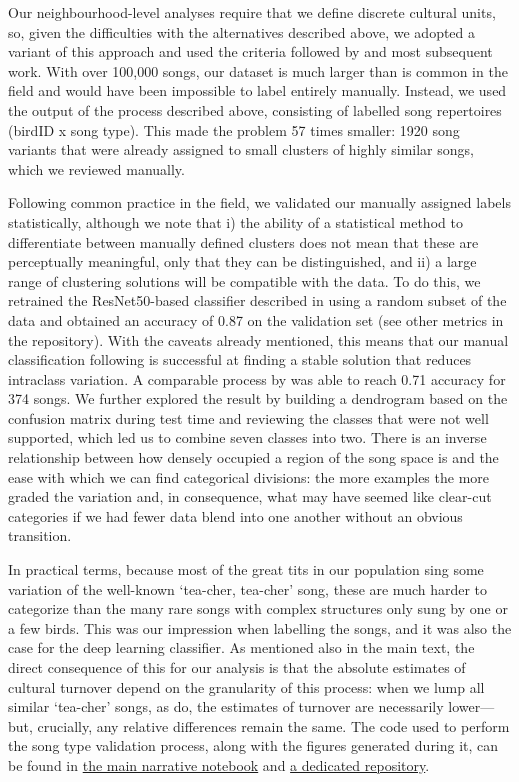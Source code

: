 Our neighbourhood-level analyses require that we define discrete cultural units, so, given the difficulties with the alternatives described above, we adopted a variant of this approach and used the criteria followed by \textcite{mcgregor1982b} and most subsequent work. With over 100,000 songs, our dataset is much larger than is common in the field and would have been impossible to label entirely manually. Instead, we used the output of the process described above, consisting of labelled song repertoires (birdID x song type). This made the problem 57 times smaller: 1920 song variants that were already assigned to small clusters of highly similar songs, which we reviewed manually.

Following common practice in the field, we validated our manually assigned labels statistically, although we note that i) the ability of a statistical method to differentiate between manually defined clusters does not mean that these are perceptually meaningful, only that they can be distinguished, and ii) a large range of clustering solutions will be compatible with the data. To do this, we retrained the ResNet50-based classifier described in \textcite{merinorecalde2023} using a random subset of the data and obtained an accuracy of 0.87 on the validation set (see other metrics in the repository). With the caveats already mentioned, this means that our manual classification following \textcite{mcgregor1982b} is successful at finding a stable solution that reduces intraclass variation. A comparable process by \textcite{fayet2014} was able to reach 0.71 accuracy for 374 songs. We further explored the result by building a dendrogram based on the confusion matrix during test time and reviewing the classes that were not well supported, which led us to combine seven classes into two. There is an inverse relationship between how densely occupied a region of the song space is and the ease with which we can find categorical divisions: the more examples the more graded the variation and, in consequence, what may have seemed like clear-cut categories if we had fewer data blend into one another without an obvious transition.

In practical terms, because most of the great tits in our population sing some variation of the well-known ‘tea-cher, tea-cher’ song, these are much harder to categorize than the many rare songs with complex structures only sung by one or a few birds. This was our impression when labelling the songs, and it was also the case for the deep learning classifier. As mentioned also in the main text, the direct consequence of this for our analysis is that the absolute estimates of cultural turnover depend on the granularity of this process: when we lump all similar ‘tea-cher’ songs, as \textcite{mcgregor1982b} do, the estimates of turnover are necessarily lower---but, crucially, any relative differences remain the same.
The code used to perform the song type validation process, along with the figures generated during it, can be found in \href{https://github.com/nilomr/wytham-songtype-validation/blob/main/notebooks/4_train-model.ipynb}{the main narrative notebook} and \href{https://github.com/nilomr/wytham-songtype-validation}{a dedicated repository}.

